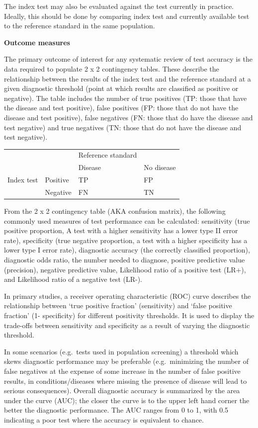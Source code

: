 \documentclass[
  10pt,
  a4paper,
  DIV=11,
  numbers=noendperiod]{scrreprt}
\begin{document}
The index test may also be evaluated against the test currently in
practice. Ideally, this should be done by comparing index test and
currently available test to the reference standard in the same
population.

\textbf{Outcome measures}

The primary outcome of interest for any systematic review of test
accuracy is the data required to populate 2 x 2 contingency tables.
These describe the relationship between the results of the index test
and the reference standard at a given diagnostic threshold (point at
which results are classified as positive or negative). The table
includes the number of true positives (TP: those that have the disease
and test positive), false positives (FP: those that do not have the
disease and test positive), false negatives (FN: those that do have the
disease and test negative) and true negatives (TN: those that do not
have the disease and test negative).

\begin{longtable}[]{@{}llll@{}}
\toprule\noalign{}
\endhead
\bottomrule\noalign{}
\endlastfoot
& & Reference standard & \\
& & Disease & No disease \\
Index test & Positive & TP & FP \\
& Negative & FN & TN \\
\end{longtable}

From the 2 x 2 contingency table (AKA confusion matrix), the following
commonly used measures of test performance can be calculated:
sensitivity (true positive proportion, A test with a higher sensitivity
has a lower type II error rate), specificity (true negative proportion,
a test with a higher specificity has a lower type I error rate),
diagnostic accuracy (the correctly classified proportion), diagnostic
odds ratio, the number needed to diagnose, positive predictive value
(precision), negative predictive value, Likelihood ratio of a positive
test (LR+), and Likelihood ratio of a negative test (LR-).

In primary studies, a receiver operating characteristic (ROC) curve
describes the relationship between `true positive fraction'
(sensitivity) and `false positive fraction' (1- specificity) for
different positivity thresholds. It is used to display the trade-offs
between sensitivity and specificity as a result of varying the
diagnostic threshold.

In some scenarios (e.g.~tests used in population screening) a threshold
which skews diagnostic performance may be preferable (e.g.~minimizing
the number of false negatives at the expense of some increase in the
number of false positive results, in conditions/diseases where missing
the presence of disease will lead to serious consequences). Overall
diagnostic accuracy is summarized by the area under the curve (AUC); the
closer the curve is to the upper left hand corner the better the
diagnostic performance. The AUC ranges from 0 to 1, with 0.5 indicating
a poor test where the accuracy is equivalent to chance.
\end{document}
